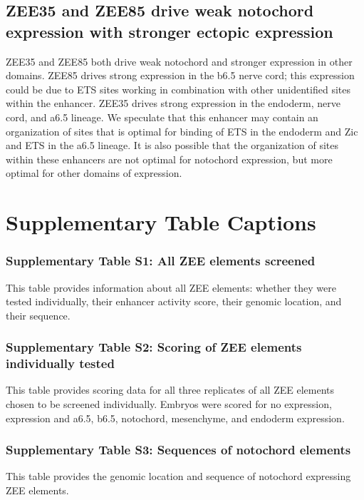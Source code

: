 \subsection{ZEE35 and ZEE85 drive weak notochord expression with stronger ectopic expression}
ZEE35 and ZEE85 both drive weak notochord and stronger expression in other domains. ZEE85 drives strong expression in the b6.5 nerve cord; this expression could be due to ETS sites working in combination with other unidentified sites within the enhancer. ZEE35 drives strong expression in the endoderm, nerve cord, and a6.5 lineage. We speculate that this enhancer may contain an organization of sites that is optimal for binding of ETS in the endoderm and Zic and ETS in the a6.5 lineage. It is also possible that the organization of sites within these enhancers are not optimal for notochord expression, but more optimal for other domains of expression.

\section{Supplementary Table Captions}

\subsubsection{Supplementary Table S1: All ZEE elements screened}
This table provides information about all ZEE elements: whether they were tested individually, their enhancer activity score, their genomic location, and their sequence.

\subsubsection{Supplementary Table S2: Scoring of ZEE elements individually tested}
This table provides scoring data for all three replicates of all ZEE elements chosen to be screened individually. Embryos were scored for no expression, expression and a6.5, b6.5, notochord, mesenchyme, and endoderm expression.

\subsubsection{Supplementary Table S3: Sequences of notochord elements}
This table provides the genomic location and sequence of notochord expressing ZEE elements.

